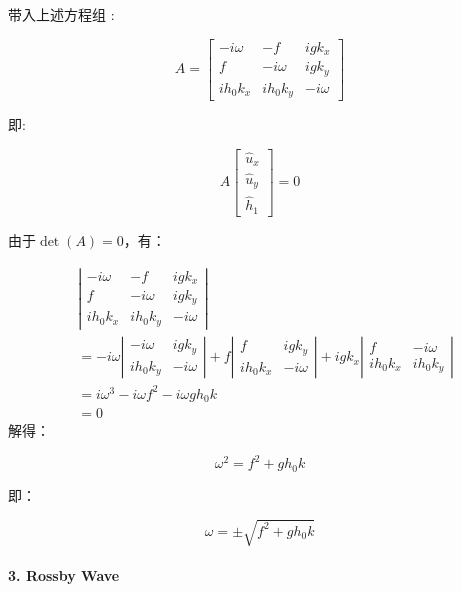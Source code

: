 \documentclass[fontset=windows]{report}
\begin{document}
带入上述方程组 :

\[A=
\left[
 \begin{matrix}
   -i\omega & -f & igk_x \\
   f & -i\omega & igk_y \\
   ih_0k_x & ih_0k_y & -i\omega
  \end{matrix}
  \right]\]

即:

\[A \left[
 \begin{matrix}
   \hat u_x \\
   \hat u_y \\
   \hat h_1
  \end{matrix}
  \right]=0\]

由于\(\det(A)=0\)，有：

\begin{equation}
\begin{array}{cr}
&\left|
 \begin{matrix}
   -i\omega & -f & igk_x \\
   f & -i\omega & igk_y \\
   ih_0k_x & ih_0k_y & -i\omega
  \end{matrix}
  \right|\\
&=-i\omega
\left|
 \begin{matrix}
   -i\omega & igk_y \\
   ih_0k_y & -i\omega
  \end{matrix}
\right| 
+f
\left|
 \begin{matrix}
   f & igk_y\\
   ih_0k_x & -i\omega 
  \end{matrix}
\right|
+
igk_x
\left|
 \begin{matrix}
   f & -i\omega\\
   ih_0k_x & ih_0k_y 
  \end{matrix}
\right| \\

& = i\omega^3-i\omega f^2-i\omega gh_0k\\
& = 0
\end{array}
\end{equation}
解得：

\[\omega^2=f^2+gh_0k\]

即：

\[\omega=\pm\sqrt{f^2+gh_0k}\]

\hypertarget{3-rossby-wave}{%
\paragraph{3. Rossby Wave}\label{3-rossby-wave}}
\end{document}
